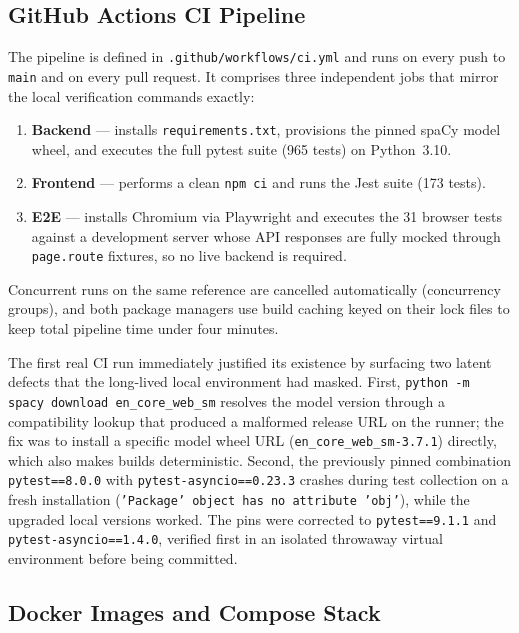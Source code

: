 \subsection{GitHub Actions CI Pipeline}

The pipeline is defined in \texttt{.github/workflows/ci.yml} and runs on
every push to \texttt{main} and on every pull request. It comprises three
independent jobs that mirror the local verification commands exactly:

\begin{enumerate}
  \item \textbf{Backend} --- installs \texttt{requirements.txt}, provisions
  the pinned spaCy model wheel, and executes the full pytest suite (965
  tests) on Python~3.10.
  \item \textbf{Frontend} --- performs a clean \texttt{npm ci} and runs the
  Jest suite (173 tests).
  \item \textbf{E2E} --- installs Chromium via Playwright and executes the
  31 browser tests against a development server whose API responses are
  fully mocked through \texttt{page.route} fixtures, so no live backend is
  required.
\end{enumerate}

Concurrent runs on the same reference are cancelled automatically
(concurrency groups), and both package managers use build caching keyed
on their lock files to keep total pipeline time under four minutes.

The first real CI run immediately justified its existence by surfacing two
latent defects that the long-lived local environment had masked. First,
\texttt{python -m spacy download en\_core\_web\_sm} resolves the model
version through a compatibility lookup that produced a malformed release
URL on the runner; the fix was to install a specific model wheel URL
(\texttt{en\_core\_web\_sm-3.7.1}) directly, which also makes builds
deterministic. Second, the previously pinned combination
\texttt{pytest==8.0.0} with \texttt{pytest-asyncio==0.23.3} crashes during
test collection on a fresh installation (\texttt{'Package' object has no
attribute 'obj'}), while the upgraded local versions worked. The pins were
corrected to \texttt{pytest==9.1.1} and \texttt{pytest-asyncio==1.4.0},
verified first in an isolated throwaway virtual environment before being
committed.

\subsection{Docker Images and Compose Stack}

